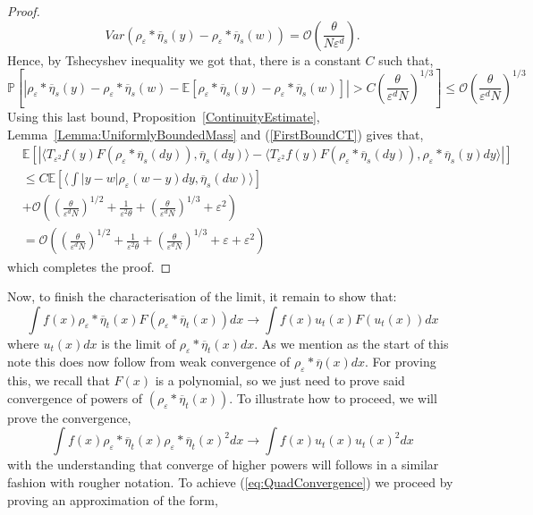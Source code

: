 \documentclass[a4paper,12pt]{article}
\newcommand{\EE}{\mathbb{E}}
\newcommand{\PP}{\mathbb{P}}
\newcommand{\1}{{\bf {1}}}
\def\epsilon{\varepsilon}
\begin{document}
\begin{proof}
\[ Var(\rho_\epsilon * \overline{\eta}_s(y) - \rho_\epsilon * \overline{\eta}_s(w)) = \mathcal{O}\left(\frac{\theta}{N \epsilon^d}\right).\]
Hence, by  Tshecyshev inequality we got that, there is a constant $C$ such that, 
\[ \PP\left[|\rho_\epsilon * \overline{\eta}_s(y) - \rho_\epsilon * \overline{\eta}_s(w) - \EE[\rho_\epsilon * \overline{\eta}_s(y) - \rho_\epsilon * \overline{\eta}_s(w)]| > C \left(\frac{\theta}{\epsilon^d N}\right)^{1/3}\right] \leq \mathcal{O}\left(\frac{\theta}{\epsilon^d N}\right)^{1/3} \]
Using this last bound, Proposition~\ref{ContinuityEstimate}, Lemma~\ref{Lemma:UniformlyBoundedMass} and (\ref{FirstBoundCT}) gives that,
\begin{align*}
&\EE[|\langle T_{\epsilon^2} f(y) F(\rho_\epsilon *\overline{\eta}_s(dy)), \overline{\eta}_s(dy) \rangle - \langle T_{\epsilon^2} f(y) F(\rho_\epsilon * \overline{\eta}_s(dy)), \rho_\epsilon * \overline{\eta}_s(y) dy \rangle|] \\ &\leq   C \EE[ \langle \int | y - w |  \rho_\epsilon(w-y)dy, \overline{\eta}_s(dw) \rangle  ]  \\  &+ \mathcal{O}\left( \left(\frac{\theta}{\epsilon^d N}\right)^{1/2} + \frac{1}{\epsilon^2 \theta}+ \left(\frac{\theta}{\epsilon^d N}\right)^{1/3} + \epsilon^2\right) \\ &= \mathcal{O}\left( \left(\frac{\theta}{\epsilon^d N}\right)^{1/2} + \frac{1}{\epsilon^2 \theta}+ \left(\frac{\theta}{\epsilon^d N}\right)^{1/3} + \epsilon +  \epsilon^2\right) 
\end{align*}
which completes the proof.
\end{proof}
Now, to finish the characterisation of the limit, it remain to show that:
\[ \int f(x) \rho_\epsilon * \overline{\eta}_t(x) F(\rho_\epsilon * \overline{\eta}_t(x)) dx \rightarrow \int f(x) u_t(x) F(u_t(x)) dx \]
where $u_t(x)dx$ is the limit of $\rho_\epsilon*\overline{\eta}_t(x)dx$. As we mention as the start of this note this does now follow from weak convergence of $\rho_\epsilon*\overline{\eta}(x)dx$. For proving this, we recall that $F(x)$ is a polynomial, so we just need to prove said convergence of powers of $(\rho_\epsilon*\overline{\eta}_t(x))$. To illustrate how to proceed, we will prove the convergence,
\begin{equation} \label{eq:QuadConvergence} \int f(x) \rho_\epsilon * \overline{\eta}_t(x) \rho_\epsilon * \overline{\eta}_t(x)^2 dx \rightarrow \int f(x) u_t(x) u_t(x)^2 dx \end{equation}
with the understanding that converge of higher powers will follows in a similar fashion with rougher notation. To achieve (\ref{eq:QuadConvergence}) we proceed by proving an approximation of the form,
\end{document}
